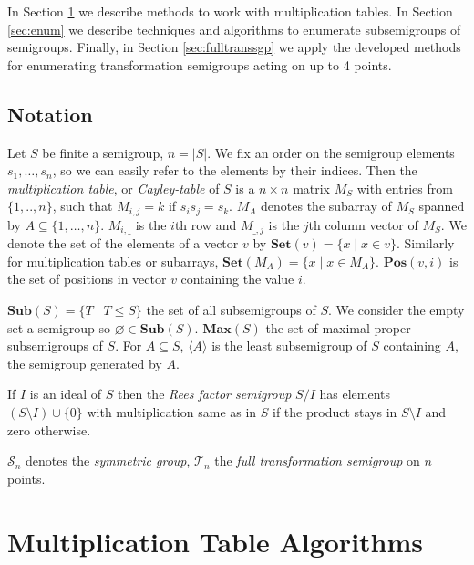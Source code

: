 \documentclass{amsart}
\newcommand{\cT}{{\mathcal T}}
\newcommand{\cS}{{\mathcal S}}
\newcommand{\Sub}{\mathbf{Sub}}
\newcommand{\Set}{\mathbf{Set}}
\newcommand{\Pos}{\mathbf{Pos}}
\newcommand{\Max}{\mathbf{Max}}
\theoremstyle{plain}
\theoremstyle{definition}
\begin{document}
In Section \ref{sec:multab} we describe methods to work with multiplication tables.
In Section \ref{sec:enum} we describe techniques and algorithms to enumerate subsemigroups of semigroups.
Finally, in Section \ref{sec:fulltranssgp} we apply the developed methods for enumerating transformation semigroups acting on up to 4 points.

\subsection{Notation}

Let $S$ be finite a semigroup, $n=|S|$.
We fix an order on the semigroup elements $s_1,\ldots, s_n$, so we can easily refer to the elements by their indices. 
Then the  \emph{multiplication table}, or \emph{Cayley-table} of $S$ is a $n\times n$ matrix $M_S$ with entries from $\{1,..,n\}$, such that $M_{i,j}=k$ if $s_is_j=s_k$.
$M_A$ denotes the subarray of $M_S$ spanned by $A\subseteq\{1,\ldots,n\}$.
$M_{i,\_}$ is the $i$th row and $M_{\_,j}$ is the $j$th column vector of $M_S$.
We denote the set of the elements of a vector $v$ by $\Set(v)=\{x\mid x\in v\}$.
Similarly for multiplication tables or subarrays, $\Set(M_A)=\{x\mid x\in M_A\}$.
$\Pos(v,i)$ is the set of positions in vector $v$ containing the value $i$.

$\Sub(S)=\big\{T\mid T\leq S \big\}$ the set of all subsemigroups of $S$.
We consider the empty set a semigroup so $\varnothing\in\Sub(S)$.
$\Max(S)$ the set of maximal proper subsemigroups of $S$.
For $A\subseteq S$, $\langle A\rangle$ is the least subsemigroup of $S$ containing $A$, the semigroup generated by $A$. 

If $I$ is an ideal of $S$ then the \emph{Rees factor semigroup} $S/I$ has elements $(S\setminus I)\cup\{0\}$ with multiplication same as in $S$ if the product stays in $S\setminus I$ and zero otherwise.

$\cS_n$ denotes the \emph{symmetric group}, $\cT_n$ the \emph{full transformation semigroup} on $n$ points.

\section{Multiplication Table Algorithms}
\label{sec:multab}
\end{document}
